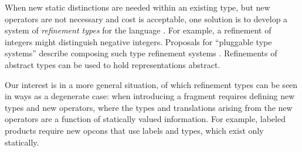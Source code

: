 \documentclass[10pt,preprint]{sigplanconf}
\begin{document}
When new static distinctions are needed within an existing type, but new operators are not necessary and cost is acceptable, one solution is to develop a system of \emph{refinement types} for the language \cite{Freeman91}. For example, a refinement of  integers might distinguish negative integers. Proposals for ``pluggable type systems'' describe composing such type refinement systems \cite{Brac04a,Andreae:2006:FIP:1167473.1167479}. Refinements of abstract types can be used to hold representations abstract. %

Our interest is in a more general situation, of which refinement types can be seen in ways as a degenerate case: when introducing a fragment requires defining new types and new operators, where the types and translations arising from the new operators are a  function of  statically valued information. 
For example, labeled products require new opcons that use labels and types, which exist only statically. %

\end{document}
